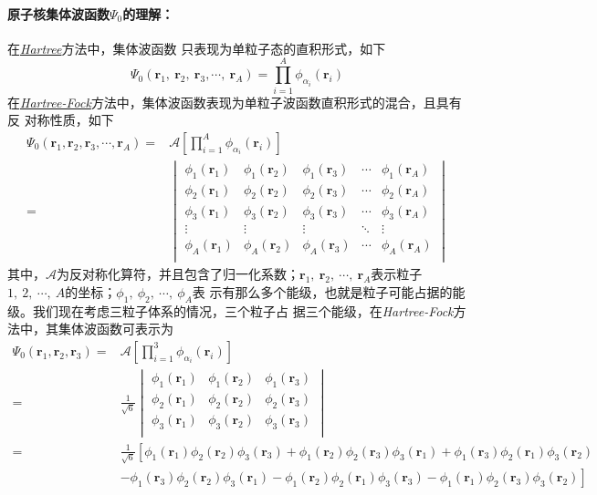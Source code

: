 \paragraph*{原子核集体波函数$\Psi_0$的理解：}在\uline{\textsl{Hartree}}方法中，集体波函数
只表现为单粒子态的直积形式，如下
\begin{equation}
	\Psi_0(\bm{r}_1,\ \bm{r}_2,\ \bm{r}_3,\cdots,\ \bm{r}_A) = \prod_{i=1}^{A} 
    \phi_{\alpha_i}(\bm{r}_i)
\end{equation} 
在\uline{\textsl{Hartree-Fock}}方法中，集体波函数表现为单粒子波函数直积形式的混合，且具有反
对称性质，如下
\begin{equation}
    \begin{aligned}
		\Psi_0(\bm{r}_1, \bm{r}_2, \bm{r}_3, \cdots, \bm{r}_A) ={}& \mathcal{A}\left[ 
        \prod_{i=1}^{A} \phi_{\alpha_i}(\bm{r}_i) \right]	\\
		={}& 
		\begin{vmatrix}
			\phi_1(\bm{r}_1)	&	\phi_1(\bm{r}_2)	&	\phi_1(\bm{r}_3)	&	\cdots	&	\phi_1(\bm{r}_A)	\\
			\phi_2(\bm{r}_1)	&	\phi_2(\bm{r}_2)	&	\phi_2(\bm{r}_3)	&	\cdots	&	\phi_2(\bm{r}_A)	\\
			\phi_3(\bm{r}_1)	&	\phi_3(\bm{r}_2)	&	\phi_3(\bm{r}_3)	&	\cdots	&	\phi_3(\bm{r}_A)	\\
			\vdots				&	\vdots				&	\vdots				&	\ddots	&	\vdots				\\
			\phi_A(\bm{r}_1)	&	\phi_A(\bm{r}_2)	&	\phi_A(\bm{r}_3)	&	\cdots	&	\phi_A(\bm{r}_A)	\\
		\end{vmatrix}
    \end{aligned}
\end{equation} 
	其中，$\mathcal{A}$为反对称化算符，并且包含了归一化系数；$\bm{r}_1,\ \bm{r}_2,\ \cdots,
    \ \bm{r}_A$表示粒子$1,\ 2,\ \cdots,\ A$的坐标；$\phi_1,\ \phi_2,\ \cdots,\ \phi_A$表
    示有那么多个能级，也就是粒子可能占据的能级。我们现在考虑三粒子体系的情况，三个粒子占
    据三个能级，在\textsl{Hartree-Fock}方法中，其集体波函数可表示为
\begin{equation}
    \begin{aligned}
		\Psi_0(\bm{r}_1, \bm{r}_2, \bm{r}_3) ={}& \mathcal{A}\left[ \prod_{i=1}^{3} 
        \phi_{\alpha_i}(\bm{r}_i) \right]	\\
		={}& \frac{1}{\sqrt{6}} 
		\begin{vmatrix}
			\phi_1(\bm{r}_1)	&	\phi_1(\bm{r}_2)	&	\phi_1(\bm{r}_3)	\\
			\phi_2(\bm{r}_1)	&	\phi_2(\bm{r}_2)	&	\phi_2(\bm{r}_3)	\\
			\phi_3(\bm{r}_1)	&	\phi_3(\bm{r}_2)	&	\phi_3(\bm{r}_3)	\\
		\end{vmatrix}	\\
		=& \frac{1}{\sqrt{6}} \left[\phi_1(\bm{r}_1)\phi_2(\bm{r}_2)\phi_3(\bm{r}_3) + \phi_1(\bm{r}_2)\phi_2(\bm{r}_3)\phi_3(\bm{r}_1) + \phi_1(\bm{r}_3)\phi_2(\bm{r}_1)\phi_3(\bm{r}_2)\right. \\
		& \left. - \phi_1(\bm{r}_3)\phi_2(\bm{r}_2)\phi_3(\bm{r}_1) - \phi_1(\bm{r}_2)\phi_2(\bm{r}_1)\phi_3(\bm{r}_3) - \phi_1(\bm{r}_1)\phi_2(\bm{r}_3)\phi_3(\bm{r}_2)\right] 
    \end{aligned}
\end{equation} 
